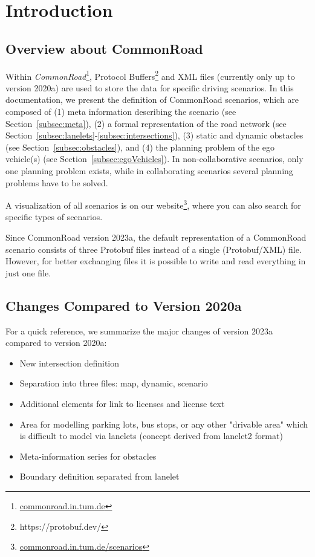 \section{Introduction}
\label{sec:introduction}
\subsection{Overview about CommonRoad}
Within \textit{CommonRoad}\cite{Althoff2017a}\footnote{\href{https://commonroad.in.tum.de}{commonroad.in.tum.de}}, Protocol Buffers\footnote{https://protobuf.dev/} and XML files (currently only up to version 2020a) are used to store the data for specific driving scenarios. 
In this documentation, we present the definition of CommonRoad scenarios, which are composed of (1) meta information describing the scenario (see Section~\ref{subsec:meta}), (2) a formal representation of the road network (see Section~\ref{subsec:lanelets}-\ref{subsec:intersections}), (3) static and dynamic obstacles (see Section~\ref{subsec:obstacles}), and (4) the planning problem of the ego vehicle(s) (see Section~\ref{subsec:egoVehicles}). 
In non-collaborative scenarios, only one planning problem exists, while in collaborating scenarios several planning problems have to be solved.

A visualization of all scenarios is on our website\footnote{\href{https://commonroad.in.tum.de/scenarios/}{commonroad.in.tum.de/scenarios}}, where you can also search for specific types of scenarios.

Since CommonRoad version 2023a, the default representation of a CommonRoad scenario consists of three Protobuf files instead of a  single (Protobuf/XML) file.
However, for better exchanging files it is possible to write and read everything in just one file.


\subsection{Changes Compared to Version 2020a}

For a quick reference, we summarize the major changes of version 2023a compared to version 2020a:
\begin{itemize}
\item New intersection definition
\item Separation into three files: map, dynamic, scenario 
\item Additional elements for link to licenses and license text
\item Area for modelling parking lots, bus stops, or any other "drivable area" which is difficult to model via lanelets (concept derived from lanelet2 format)
\item Meta-information series for obstacles
\item Boundary definition separated from lanelet 
\end{itemize}

